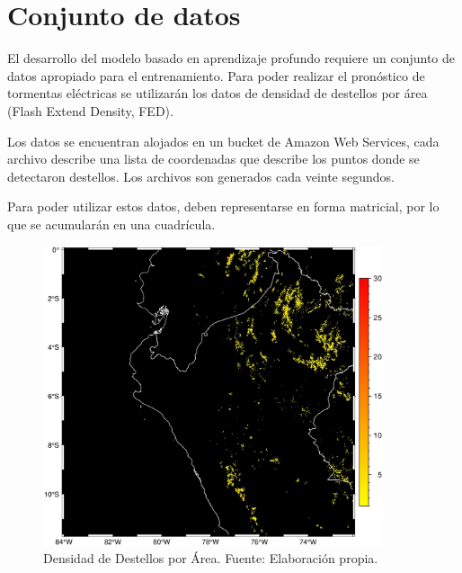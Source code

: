 \section{Conjunto de datos}

El desarrollo del modelo basado en aprendizaje profundo requiere un conjunto de 
datos apropiado para el entrenamiento. Para poder realizar el pronóstico de 
tormentas eléctricas se utilizarán los datos de densidad de destellos por área 
(Flash Extend Density, FED).

Los datos se encuentran alojados en un bucket de Amazon Web Services, cada 
archivo describe una lista de coordenadas que describe los puntos donde se 
detectaron destellos. Los archivos son generados cada veinte segundos.

Para poder utilizar estos datos, deben representarse en forma matricial, por lo 
que se acumularán en una cuadrícula.

\begin{figure}[H]
  \centering
  \includegraphics[width=10cm]{E_IMAGENES/5_Metodologia/fed_puntual}
  \caption[Densidad de Destellos por Área]{
    Densidad de Destellos por Área. \newline 
    Fuente: Elaboración propia.
  }
  \label{fig:fed}
\end{figure}



